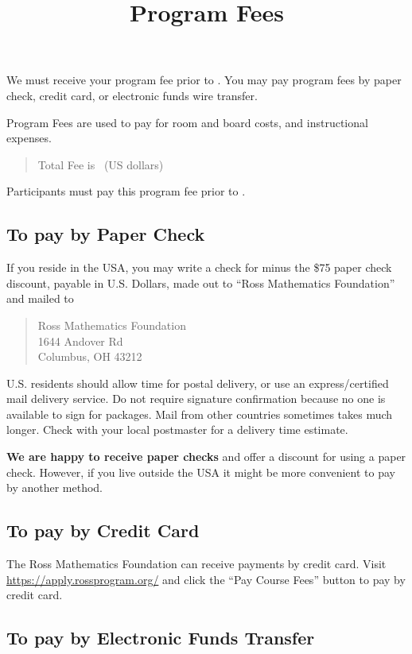 \documentclass[11pt]{ross}
\title{Program Fees}
\begin{document}
\maketitle

We must receive your program fee prior to \feeduedate.  You may pay
program fees by paper check, credit card, or electronic funds wire
transfer.

Program Fees are used to pay for room and board costs, and instructional expenses.
\begin{quote}
Total Fee is \totalfee \ (US dollars)
\end{quote}  

Participants must pay this program fee prior to \feeduedate.

\subsection*{To pay by Paper Check}

If you reside in the USA, you may write a check for \totalfee minus
the \$75 paper check discount, payable in U.S. Dollars, made out to
``Ross Mathematics Foundation'' and mailed to
\begin{quote}
Ross Mathematics Foundation  \\
1644 Andover Rd \\
Columbus, OH 43212
\end{quote} U.S. residents should allow time for postal delivery, or
use an express/certified mail delivery service. Do not require
signature confirmation because no one is available to sign for
packages.  Mail from other countries sometimes takes much longer.
Check with your local postmaster for a delivery time estimate.

\textbf{We are happy to receive paper checks} and offer a discount for
using a paper check.  However, if you live outside the USA it might be
more convenient to pay by another method.

\subsection*{To pay by Credit Card}

The Ross Mathematics Foundation can receive payments by credit card.
Visit \url{https://apply.rossprogram.org/} and click the ``Pay Course
Fees'' button to pay by credit card.

\subsection*{To pay by Electronic Funds Transfer}
\end{document}
